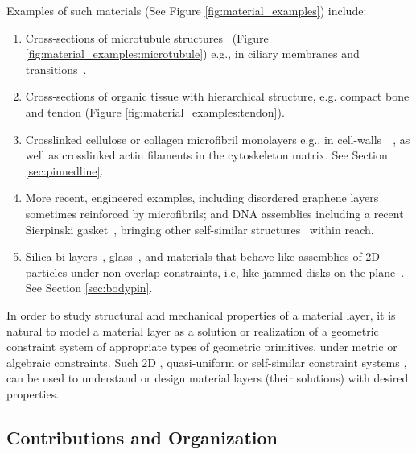 Examples of such materials (See Figure \ref{fig:material_examples})
include:
%
\begin{enumerate}
    \item \label{materialexample1} Cross-sections of microtubule structures~\cite{microtubule_necklace} (Figure \ref{fig:material_examples:microtubule}) e.g., in ciliary membranes and transitions~\cite{microtubule_cilia}.

    \item \label{materialexample2} Cross-sections of organic tissue with hierarchical structure, e.g. compact bone and tendon (Figure \ref{fig:material_examples:tendon}).

    \item \label{materialexample3} Crosslinked cellulose or collagen microfibril monolayers e.g., in cell-walls~\cite{wikimediacommons2010afm}~\cite{wikimediacommons2007plant}, as well as crosslinked actin filaments in the cytoskeleton matrix. See Section \ref{sec:pinnedline}.

    \item \label{materialexample4} More recent, engineered examples, including disordered graphene layers~\cite{Graphene1}~\cite{Graphene2} sometimes reinforced by microfibrils; and DNA assemblies including a recent Sierpinski gasket~\cite{self_assembly_sierpinski}, bringing other self-similar structures~\cite{wikimediacommons2012subdivision} within reach.

    \item \label{materialexample5} Silica bi-layers~\cite{silica_bilayers}, glass~\cite{sructure_of_2d_glass}, and materials that behave like assemblies of 2D particles under non-overlap constraints, i.e, like jammed disks on the plane~\cite{jammed_disks}. See Section \ref{sec:bodypin}.
\end{enumerate}
%
In order to study structural and mechanical properties of a material layer, it is natural to model a material layer as a solution or realization of a geometric constraint system of appropriate types of geometric primitives, under metric or algebraic constraints. Such 2D , quasi-uniform or self-similar constraint systems \seedefsprelim, can be used to understand or design material layers (their solutions) with desired properties.





\subsection{Contributions and Organization}
\label{sec:cont}

